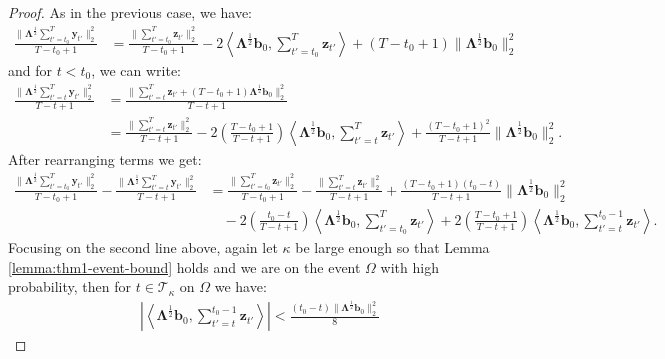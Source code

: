 \begin{proof}
As in the previous case, we have:
\begin{align*}
    \frac{\lVert\boldsymbol{\Lambda}^{\frac{1}{2}} \sum_{t'=t_0}^T\mathbf{y}_{t'}\rVert_2^2}{T-t_0+1} &= \frac{\lVert\sum_{t'=t_0}^T\mathbf{z}_{t'}\rVert_2^2}{T-t_0+1} - 2\left\langle \boldsymbol{\Lambda}^{\frac{1}{2}}\mathbf{b}_0, \sum_{t'=t_0}^T\mathbf{z}_{t'}\right\rangle + (T-t_0+1)\lVert\boldsymbol{\Lambda}^{\frac{1}{2}}\mathbf{b}_0\rVert_2^2
\end{align*}
and for $t < t_0$, we can write:
\begin{align*}
    \frac{\lVert\boldsymbol{\Lambda}^{\frac{1}{2}} \sum_{t'=t}^T\mathbf{y}_{t'}\rVert_2^2}{T-t+1} &= \frac{\lVert \sum_{t'=t}^T\mathbf{z}_{t'} + (T-t_0+1)\boldsymbol{\Lambda}^{\frac{1}{2}}\mathbf{b}_0\rVert_2^2}{T-t+1} \\
    &= \frac{\lVert \sum_{t'=t}^T\mathbf{z}_{t'}\rVert_2^2}{T-t+1} -2\left(\frac{T-t_0+1}{T-t+1}\right) \left\langle \boldsymbol{\Lambda}^{\frac{1}{2}}\mathbf{b}_0, \sum_{t'=t}^T\mathbf{z}_{t'}\right\rangle  + \frac{(T-t_0+1)^2}{T-t+1}\lVert\boldsymbol{\Lambda}^{\frac{1}{2}}\mathbf{b}_0\rVert_2^2.
\end{align*}
After rearranging terms we get:
\begin{align*}
    \frac{\lVert\boldsymbol{\Lambda}^{\frac{1}{2}} \sum_{t'=t_0}^T\mathbf{y}_{t'}\rVert_2^2}{T-t_0+1} - \frac{\lVert\boldsymbol{\Lambda}^{\frac{1}{2}} \sum_{t'=t}^T\mathbf{y}_{t'}\rVert_2^2}{T-t+1} &=\frac{\lVert \sum_{t'=t_0}^T\mathbf{z}_{t'}\rVert_2^2}{T-t_0+1} - \frac{\lVert\sum_{t'=t}^T\mathbf{z}_{t'}\rVert_2^2}{T-t+1} + \frac{(T-t_0+1)(t_0 - t) }{T-t+1}\lVert\boldsymbol{\Lambda}^{\frac{1}{2}} \mathbf{b}_0\rVert^2_2 \\
    &\quad - 2\left(\frac{t_0 - t}{T-t+1}\right)\left\langle \boldsymbol{\Lambda}^{\frac{1}{2}}\mathbf{b}_0, \sum_{t'=t_0}^T\mathbf{z}_{t'}\right\rangle + 2\left(\frac{T-t_0+1}{T-t+1}\right)\left\langle \boldsymbol{\Lambda}^{\frac{1}{2}}\mathbf{b}_0, \sum_{t'=t}^{t_0-1}\mathbf{z}_{t'}\right\rangle.
\end{align*}
Focusing on the second line above, again let $\kappa$ be large enough so that Lemma \ref{lemma:thm1-event-bound} holds and we are on the event $\Omega$ with high probability, then for $t \in \mathcal{T}_\kappa$ on $\Omega$ we have:
\begin{align*}
    \left|\left\langle\boldsymbol{\Lambda}^{\frac{1}{2}}\mathbf{b}_0, \sum_{t'=t}^{t_0-1}\mathbf{z}_{t'} \right\rangle\right| < \frac{(t_0-t) \lVert\boldsymbol{\Lambda}^{\frac{1}{2}} \mathbf{b}_0\rVert_2^2}{8} \tag{on $\Omega_1 \subseteq \Omega$}

\end{align*}
\end{proof}
